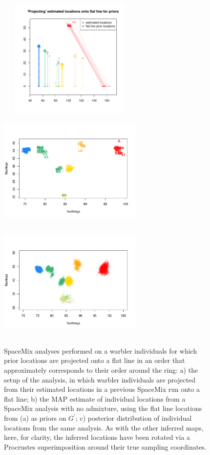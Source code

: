 \documentclass[12pt]{article}
\begin{document}
\begin{figure}
	\centering
			{\includegraphics[width=2.8in,height=2.33in]{figs/warblers/warb_inds_on_a_line_setup.pdf}}
			{\includegraphics[width=2.8in,height=2.33in]{figs/warblers/warb_inds_on_a_line_MAP1.pdf}}
			{\includegraphics[width=2.8in,height=2.33in]{figs/warblers/warb_inds_on_a_line_post1.pdf}}
	\caption{SpaceMix analyses performed on a warbler individuals for which prior locations are projected onto a flat line in an order that approximately corresponds to their order around the ring: a) the setup of the analysis, in which warbler individuals are projected from their estimated locations in a previous SpaceMix run onto a flat line; b) the MAP estimate of individual locations from a SpaceMix analysis with no admixture, using the flat line locations from (a) as priors on $G^{\prime}$; c) posterior distribution of individual locations from the same analysis.  As with the other inferred maps, here, for clarity, the inferred locations have been rotated via a Procrustes superimposition around their true sampling coordinates.}
	\label{sfig:warb_inds_on_a_line}
\end{figure}
\end{document}

